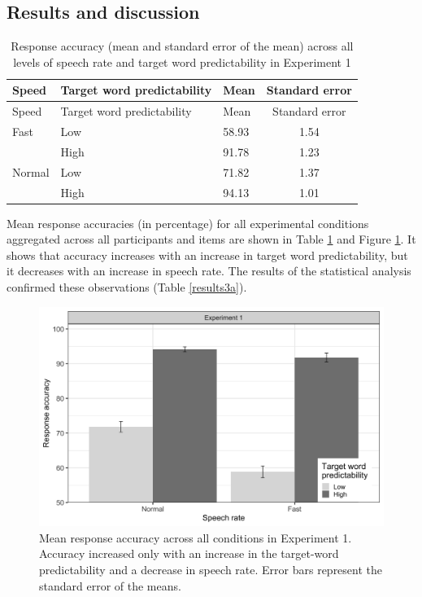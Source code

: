 \documentclass[a4paper, nobind]{templates/ociamthesis}
\begin{document}
\hypertarget{results-and-discussion-3}{%
\subsection{Results and discussion}\label{results-and-discussion-3}}

\begin{longtable}[]{@{}lllc@{}}
\caption{Response accuracy (mean and standard error of the mean) across all levels of speech rate and target word predictability in Experiment 1}
\label{summary3a}
\tabularnewline
\toprule
Speed & Target word predictability & Mean & Standard
error \\
\midrule
\endfirsthead
\toprule
Speed & Target word predictability & Mean & Standard
error \\
\midrule
\endhead
Fast & Low & 58.93 & 1.54 \\
& High & 91.78 & 1.23 \\
Normal & Low & 71.82 & 1.37 \\
& High & 94.13 & 1.01 \\
\bottomrule
\end{longtable}

Mean response accuracies (in percentage) for all experimental conditions aggregated across all participants and items are shown in Table \ref{summary3a} and Figure \ref{fig:figure3a}.
It shows that accuracy increases with an increase in target word predictability, but it decreases with an increase in speech rate.
The results of the statistical analysis confirmed these observations (Table \ref{results3a}).

\begin{figure}

{\centering \includegraphics[width=0.95\linewidth]{figures/results-fig/expt-3a} 

}

\caption{Mean response accuracy across all conditions in Experiment 1. Accuracy increased only with an increase in the target-word predictability and a decrease in speech rate. Error bars represent the standard error of the means.}\label{fig:figure3a}
\end{figure}
\end{document}

